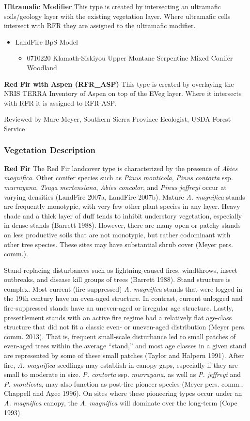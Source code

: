 \noindent \textbf{Ultramafic Modifier} This type is created by intersecting an ultramafic soils/geology layer with the existing vegetation layer. Where ultramafic cells intersect with RFR they are assigned to the ultramafic modifier.
\begin{itemize}
	\item LandFire BpS Model
	\begin{itemize}
		\item 0710220 Klamath-Siskiyou Upper Montane Serpentine Mixed Conifer Woodland
	\end{itemize}
\end{itemize}

\noindent \textbf{Red Fir with Aspen (RFR\_ASP)} This type is created by overlaying the NRIS TERRA Inventory of Aspen on top of the EVeg layer. Where it intersects with RFR it is assigned to RFR-ASP.

\noindent Reviewed by Marc Meyer, Southern Sierra Province Ecologist, USDA Forest Service

\subsubsection{Vegetation Description}
\textbf{Red Fir} The Red Fir landcover type is characterized by the presence of \emph{Abies magnifica}. Other conifer species such as \emph{Pinus monticola}, \emph{Pinus contorta} ssp. \emph{murrayana}, \emph{Tsuga mertensiana}, \emph{Abies concolor}, and \emph{Pinus jeffreyi} occur at varying densities (LandFire 2007a, LandFire 2007b). Mature \emph{A. magnifica} stands are frequently monotypic, with very few other plant species in any layer. Heavy shade and a thick layer of duff tends to inhibit understory vegetation, especially in dense stands (Barrett 1988). However, there are many open or patchy stands on less productive soils that are not monotypic, but rather codominant with other tree species. These sites may have substantial shrub cover (Meyer pers. comm.).

Stand-replacing disturbances such as lightning-caused fires, windthrows, insect outbreaks, and disease kill groups of trees (Barrett 1988). Stand structure is complex. Most current (fire-suppressed) \emph{A. magnifica} stands that were logged in the 19th century have an even-aged structure. In contrast, current unlogged and fire-suppressed stands have an uneven-aged or irregular age structure. Lastly, presettlement stands with an active fire regime had a relatively flat age-class structure that did not fit a classic even- or uneven-aged distribution (Meyer pers. comm. 2013). That is, frequent small-scale disturbance led to small patches of even-aged trees within the average ``stand,'' and most age classes in a given stand are represented by some of these small patches (Taylor and Halpern 1991). After fire, \emph{A. magnifica} seedlings may establish in canopy gaps, especially if they are small to moderate in size. \emph{P. contorta} ssp. \emph{murrayana}, as well as \emph{P. jeffreyi} and \emph{P. monticola}, may also function as post-fire pioneer species (Meyer pers. comm., Chappell and Agee 1996). On sites where these pioneering types occur under an \emph{A. magnifica} canopy, the \emph{A. magnifica} will dominate over the long-term (Cope 1993).

